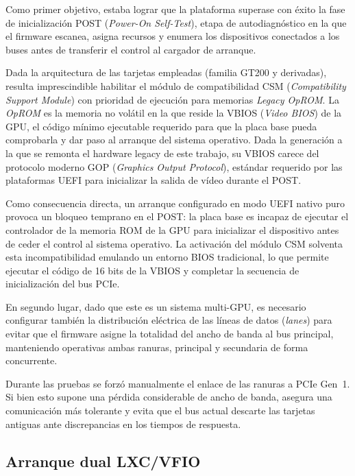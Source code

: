 Como primer objetivo, estaba lograr que la plataforma superase con éxito la fase 
de inicialización POST (\textit{Power-On Self-Test}), etapa de autodiagnóstico en la que el 
firmware escanea, asigna recursos y enumera los dispositivos conectados a los buses antes de 
transferir el control al cargador de arranque.

Dada la arquitectura de las tarjetas empleadas (familia GT200 y derivadas), resulta imprescindible 
habilitar el módulo de compatibilidad CSM (\textit{Compatibility Support Module}) con prioridad de 
ejecución para memorias \textit{Legacy OpROM}. La \textit{OpROM} es la memoria no volátil en la que reside 
la VBIOS (\textit{Video BIOS}) de la GPU,
el código mínimo
ejecutable requerido para que la placa base pueda comprobarla y dar paso al arranque del sistema
operativo. Dada la generación a la que se remonta el hardware legacy de este trabajo, su VBIOS carece
del protocolo moderno GOP (\textit{Graphics Output Protocol}), 
estándar requerido por las plataformas UEFI para inicializar la salida de vídeo durante el POST. 

Como consecuencia directa, un arranque configurado en modo UEFI nativo puro provoca un bloqueo temprano en el POST: 
la placa base es incapaz de ejecutar el controlador de la memoria ROM de la GPU para inicializar el dispositivo 
antes de ceder el control al sistema operativo. La activación del módulo CSM solventa esta incompatibilidad 
emulando un entorno BIOS tradicional, lo que permite ejecutar el código de 16 bits de la VBIOS y completar 
la secuencia de inicialización del bus PCIe.

En segundo lugar, dado que este es un sistema multi-GPU, es necesario configurar también la distribución eléctrica de 
las líneas de datos (\textit{lanes}) para evitar que el 
firmware asigne la totalidad del ancho de banda al bus principal, manteniendo operativas ambas ranuras, principal y
secundaria de forma concurrente.

Durante las pruebas se forzó manualmente el enlace de las ranuras a PCIe Gen~1. Si bien esto supone una 
pérdida considerable de ancho de banda, asegura una comunicación más tolerante y evita que el bus actual 
descarte las tarjetas antiguas ante discrepancias en los tiempos de respuesta.

\subsection{Arranque dual LXC/VFIO} \label{sec:arranque}

